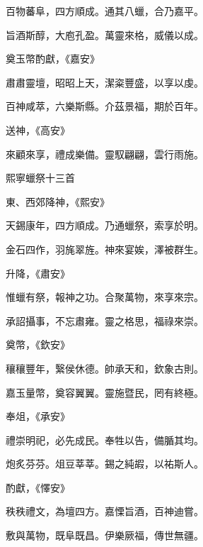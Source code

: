 \begin{pinyinscope}
 百物蕃阜，四方順成。通其八蠟，合乃嘉平。



 旨酒斯醇，大庖孔盈。萬靈來格，威儀以成。



 奠玉幣酌獻，《嘉安》



 肅肅靈壇，昭昭上天，潔粢豐盛，以享以虔。



 百神咸萃，六樂斯縣。介茲景福，期於百年。



 送神，《高安》



 來顧來享，禮成樂備。靈馭翩翩，雲行雨施。



 熙寧蠟祭十三首



 東、西郊降神，《熙安》



 天錫康年，四方順成。乃通蠟祭，索享於明。



 金石四作，羽旄翠旌。神來宴娭，澤被群生。



 升降，《肅安》



 惟蠟有祭，報神之功。合聚萬物，來享來宗。



 承詔攝事，不忘肅雍。靈之格思，福祿來崇。



 奠幣，《欽安》



 穰穰豐年，繄侯休德。帥承天和，欽象古則。



 嘉玉量幣，奠容翼翼。靈施暨民，罔有終極。



 奉俎，《承安》



 禮崇明祀，必先成民。奉牲以告，備腯其均。



 炮炙芬芬。俎豆莘莘。錫之純嘏，以祐斯人。



 酌獻，《懌安》



 秩秩禮文，為壇四方。嘉慄旨酒，百神迪嘗。



 敷與萬物，既阜既昌。伊樂厥福，傳世無疆。




\end{pinyinscope}
